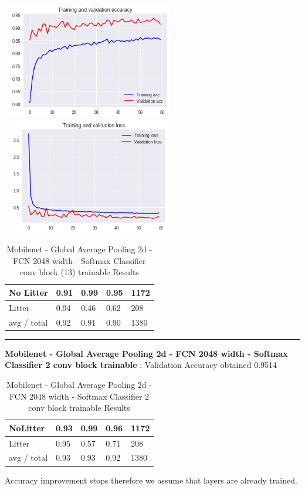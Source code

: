 \documentclass{IEEEtran}
\begin{document}
\includegraphics[width=3in,height=2in]{mobilenet-img/mobilenet-img013.png}
\includegraphics[width=3in,height=2in]{mobilenet-img/mobilenet-img014.png}


\begin{table}[ht]
\centering
\caption{Mobilenet - Global Average Pooling 2d - FCN 2048 width - Softmax Classifier conv block (13) trainable Results}
\begin{tabular}{|l|l|l|l|l|} 
\hline
No Litter &
0.91 &
0.99 &
0.95 &
1172\\\hline
Litter
 &
0.94
 &
0.46
 &
0.62
 &
208
\\\hline
avg / total
 &
0.92
 &
0.91
 &
0.90
 &
1380
\\\hline
\end{tabular}
\end{table}

\begin{center}\noindent\rule{8cm}{0.4pt}\end{center}

\textbf{Mobilenet - Global Average Pooling 2d - FCN 2048 width - Softmax Classifier 2 conv block trainable} : Validation Accuracy obtained 0.9514

\begin{table}[ht]
\centering
\caption{Mobilenet - Global Average Pooling 2d - FCN 2048 width - Softmax Classifier 2 conv block  trainable Results}
\begin{tabular}{|l|l|l|l|l|} 
\hline
NoLitter
 &
0.93
 &
0.99
 &
0.96
 &
1172
\\\hline
Litter
 &
0.95
 &
0.57
 &
0.71
 &
208
\\\hline
avg / total
 &
0.93
 &
0.93
 &
0.92
 &
1380
\\\hline
\end{tabular}
\end{table}


Accuracy improvement stops therefore we assume that layers are already trained.
\end{document}
